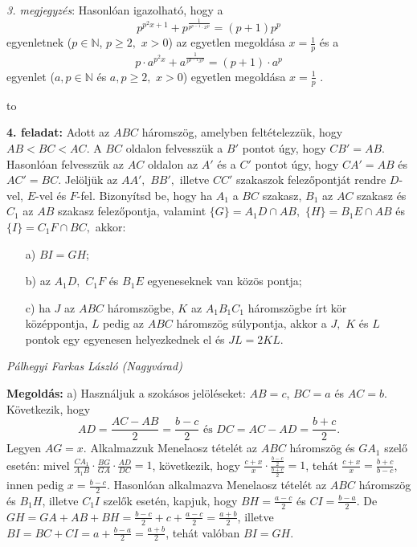 \documentclass[a4paper,10pt]{article}
\newcommand{\ki}[2]{\hfill {\it #1 (#2)}\medskip}
\newcommand{\vonal}{\hbox to \hsize{\hskip2truecm\hrulefill\hskip2truecm}}
\begin{document}
\medskip 


\textit{3. megjegyzés}: Hasonlóan igazolható, hogy a
\[{p^{{p^2}x + 1}} + {p^{\frac{1}{{{p^{p - 1}} \cdot {x^p}}}}} = (p + 1){p^p}\]
egyenletnek  ($p\in \mathbb{N}$, $p\geq 2,$  $x > 0$)
 az egyetlen megoldása  $\displaystyle x = \frac{1}{p} $ és
a  \[p \cdot {a^{{p^2}x}} + {a^{\frac{1}{{{p^{p - 1}}{x^p}}}}} = (p
+ 1) \cdot {a^p}\]   egyenlet  ($a,p\in \mathbb{N}$  és  $a,p\geq
2,$ $x
> 0$) egyetlen megoldása  $\displaystyle x = \frac{1}{p}$ .

\medskip 


\vonal

{\bf 4. feladat: } Adott az $ABC$ háromszög, amelyben feltételezzük, hogy $AB < BC <
AC$. A $BC$ oldalon felvesszük a $B'$ pontot úgy, hogy $CB'=AB.$
Hasonlóan felvesszük az $AC$ oldalon az $A'$ és a $C'$ pontot
úgy, hogy $CA'=AB$ és $AC'=BC.$ Jelöljük az $AA',$ $BB',$
illetve $CC'$ szakaszok felezőpontját rendre $D$-vel, $E$-vel
és $F$-fel. Bizonyítsd be, hogy ha ${A_1}$ a $BC$ szakasz,
${B_1}$ az $AC$ szakasz és ${C_1}$ az $AB$ szakasz felezőpontja,
valamint $\{G\}=A_1D\cap AB,$ $\{H\}=B_1E\cap AB$ és
$\{I\}=C_1F\cap BC,$ akkor:
\begin{itemize}
\item[a)] $BI=GH$; \item[b)] az ${A_1}D,$ ${C_1}F$ és ${B_1}E$
egyeneseknek van közös pontja; \item[c)] ha $J$ az $ABC$
háromszögbe, $K$ az ${A_1}{B_1}{C_1}$ háromszögbe írt kör
középpontja, $L$ pedig az $ABC$ háromszög súlypontja, akkor a $J,$
$K$ és $L$ pontok egy egyenesen helyezkednek el és $JL = 2KL.$
\end{itemize}

\ki{Pálhegyi Farkas László}{Nagyvárad}\medskip

{\bf Megoldás: } a)  Használjuk a szokásos jelöléseket: $AB = c$, $BC = a$ és $AC =
b$. Következik, hogy \[AD = \frac{{AC - AB}}{2} = \frac{{b -
c}}{2} \mbox{ és }
 DC = AC - AD = \frac{{b + c}}{2}.\]
 Legyen $AG = x$. Alkalmazzuk Menelaosz tételét az $ABC$ háromszög és $G{A_1}$ szelő
 esetén: mivel
$\frac{{C{A_1}}}{{{A_1}B}} \cdot \frac{{BG}}{{GA}} \cdot
\frac{{AD}}{{DC}} = 1$,   következik, hogy  $\frac{{c + x}}{x}
\cdot \frac{{\frac{{b - c}}{2}}}{{\frac{{b + c}}{2}}} = 1$, tehát
$\frac{{c + x}}{x} = \frac{{b + c}}{{b - c}}$, innen pedig $x =
\frac{{b - c}}{2}$. Hasonlóan alkalmazva Menelaosz tételét az $ABC$
háromszög és ${B_1}H$, illetve ${C_1}I$ szelők esetén, kapjuk,
hogy $BH = \frac{{a - c}}{2}$ és $CI = \frac{{b - a}}{2}$. De $GH =
GA + AB + BH = \frac{{b - c}}{2} + c + \frac{{a - c}}{2} = \frac{{a
+ b}}{2}$, illetve $BI = BC + CI = a + \frac{{b - a}}{2} = \frac{{a
+ b}}{2}$, tehát valóban $BI=GH$.
\end{document}
